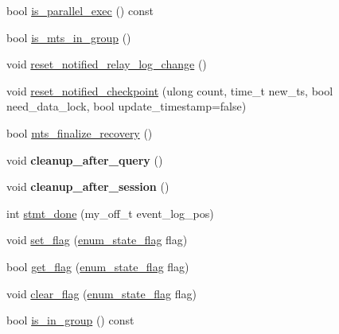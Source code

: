 \begin{DoxyCompactItemize}
\item 
bool \mbox{\hyperlink{classRelay__log__info_adb9571ba13a628556e9d1cb86ebf9393}{is\+\_\+parallel\+\_\+exec}} () const
\item 
bool \mbox{\hyperlink{classRelay__log__info_ada979f23838e56bf348c48b31fd23c1e}{is\+\_\+mts\+\_\+in\+\_\+group}} ()
\item 
void \mbox{\hyperlink{classRelay__log__info_a56730f77888663aa324d850a8f0035ec}{reset\+\_\+notified\+\_\+relay\+\_\+log\+\_\+change}} ()
\item 
void \mbox{\hyperlink{classRelay__log__info_a76074c563b1ec0566c24d4725af1de67}{reset\+\_\+notified\+\_\+checkpoint}} (ulong count, time\+\_\+t new\+\_\+ts, bool need\+\_\+data\+\_\+lock, bool update\+\_\+timestamp=false)
\item 
bool \mbox{\hyperlink{classRelay__log__info_ad2330aea71b42204dd5ee6461c30ef84}{mts\+\_\+finalize\+\_\+recovery}} ()
\item 
\mbox{\label{classRelay__log__info_a3cc1aa64774cf98d03ec2495bb7cdb95}} 
void {\bfseries cleanup\+\_\+after\+\_\+query} ()
\item 
\mbox{\label{classRelay__log__info_ae54ea3c2cd3690bc0bc8b74eb2b75e48}} 
void {\bfseries cleanup\+\_\+after\+\_\+session} ()
\item 
int \mbox{\hyperlink{classRelay__log__info_a0e802ae911c2cda3436b8e8f4c3d9468}{stmt\+\_\+done}} (my\+\_\+off\+\_\+t event\+\_\+log\+\_\+pos)
\item 
void \mbox{\hyperlink{classRelay__log__info_a54a7597da74aeb539c944d54b16bf261}{set\+\_\+flag}} (\mbox{\hyperlink{classRelay__log__info_a768d1f6426a20be0e32d7380a231c0b2}{enum\+\_\+state\+\_\+flag}} flag)
\item 
bool \mbox{\hyperlink{classRelay__log__info_ac43e0aa4092c8731d462502ca57e3a58}{get\+\_\+flag}} (\mbox{\hyperlink{classRelay__log__info_a768d1f6426a20be0e32d7380a231c0b2}{enum\+\_\+state\+\_\+flag}} flag)
\item 
void \mbox{\hyperlink{classRelay__log__info_a7fa497a605d2730224ade21a3344f15c}{clear\+\_\+flag}} (\mbox{\hyperlink{classRelay__log__info_a768d1f6426a20be0e32d7380a231c0b2}{enum\+\_\+state\+\_\+flag}} flag)
\item 
bool \mbox{\hyperlink{classRelay__log__info_a14b055b1320a2a7cd3f9c4a9df960092}{is\+\_\+in\+\_\+group}} () const
\item 
\mbox{\label{classRelay__log__info_a1746a693d7a13691b26898a5b3873a4c}} 

\end{DoxyCompactItemize}
